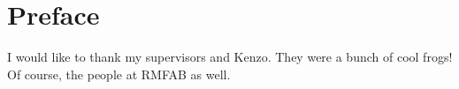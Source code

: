\chapter*{Preface}

I would like to thank my supervisors and Kenzo. They were a bunch of cool frogs! Of course, the people at RMFAB as well.